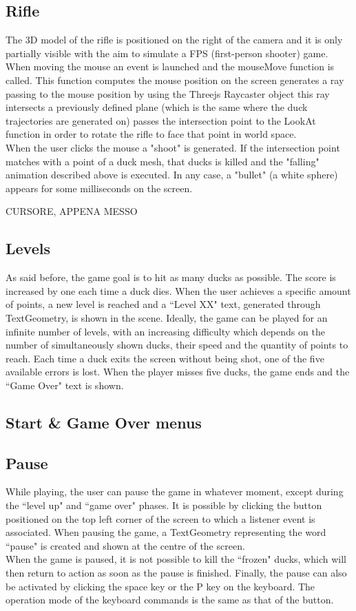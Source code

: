 \documentclass[12pt,a4paper]{article}
\begin{document}
	\subsection{Rifle}
	The 3D model of the rifle is positioned on the right of the camera and it is only partially visible with the aim to simulate a FPS (first-person shooter) game.
	When moving the mouse an event is launched and the mouseMove function is called.
	This function
	computes the mouse position on the screen
	generates a ray passing to the mouse position by using the Threejs Raycaster object
	this ray intersects a previously defined plane (which is the same where the duck trajectories are generated on)
	passes the intersection point to the LookAt function in order to rotate the rifle to face that point in world space.\\
	When the user clicks the mouse a "shoot" is generated. If the intersection point matches with a point of a duck mesh, that ducks is killed and the "falling" animation described above is executed. In any case, a "bullet" (a white sphere) appears for some milliseconds on the screen.
	
	CURSORE, APPENA MESSO
	
	\subsection{Levels}
	As said before, the game goal is to hit as many ducks as possible. The score is increased by one each time a duck dies. When the user achieves a specific amount of points, a new level is reached and a ``Level XX" text, generated through TextGeometry, is shown in the scene.
	Ideally, the game can be played for an infinite number of levels, with an increasing difficulty which depends on the number of simultaneously shown ducks, their speed and the quantity of points to reach.
	Each time a duck exits the screen without being shot, one of the five available errors is lost. When the player misses five ducks, the game ends and the ``Game Over" text is shown.
	
	\subsection{Start \& Game Over menus}
	
	\subsection{Pause}
	While playing, the user can pause the game in whatever moment, except during the ``level up" and ``game over" phases.
	It is possible by clicking the button positioned on the top left corner of the screen to which a listener event is associated.
	When pausing the game, a TextGeometry representing the word ``pause" is created and shown at the centre of the screen.\\
	When the game is paused, it is not possible to kill the ``frozen" ducks, which will then return to action as soon as the pause is finished.
	Finally, the pause can also be activated by clicking the space key or the P key on the keyboard. The operation mode of the keyboard commands is the same as that of the button.
\end{document}
